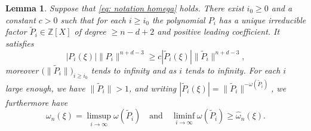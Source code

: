\documentclass[JEP,XML,SOM,Unicode,NoFloatCountersInSection,published]{cedram}
\newcommand\bZ{\mathbb{Z}}
\newcommand\tP{\widetilde{P}}
\newcommand\homega{\widehat{\omega}}\newcommand\HH{\mathcal{H}}
\newcommand{\normH}[1]{\|#1\|}
\newcommand\AND{\quad\text{and}\quad}
\theoremstyle{definition}
\theoremstyle{plain}
\newtheorem{Lem}[Def]{Lemma}
\begin{document}
\begin{Lem}
\label{lem: existence facteur irreductible grand}
Suppose that \eqref{eq: notation homega} holds. There exist $i_0\geq 0$ and a constant $c>0$ such that for each $i\geq i_0$ the polynomial $P_i$ has a unique irreducible factor $\tP_i\in\bZ[X]$ of degree $\geq n-d+2$ and positive leading coefficient. It satisfies
\begin{equation}
\label{eq lem: existence facteur irr grand eq 2}
|P_i(\xi)| \normH{P_i}^{n+d-3} \geq c|\tP_i(\xi)| \normH{\tP_i}^{n+d-3},
\end{equation}
moreover $\big(\normH{\tP_i}\big)_{i\geq i_0}$ tends to infinity and as $i$ tends to infinity. For each $i$ large enough, we have $\normH{\tP_i}>1$, and writing $|\tP_i(\xi)| = \normH{\tP_i}^{-\omega(\tP_i)}$, we furthermore have
\begin{equation}
\label{eq lem: existence facteur irr grand eq 1}
\omega_n(\xi) = \limsup_{i\to\infty} \omega(\tP_i) \AND \liminf_{i\to\infty} \omega(\tP_i) \geq \homega_n(\xi).
\end{equation}
\end{Lem}
\end{document}
